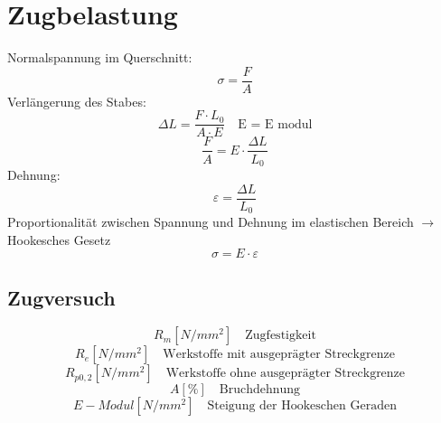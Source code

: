 



\section{Zugbelastung}
Normalspannung im Querschnitt: 
\[ \sigma = \frac{F}{A} \]
Verlängerung des Stabes: 
\[ \Delta L = \frac{F \cdot L_0}{A \cdot E} \quad \text{E = E modul} \]
\[ \frac{F}{A} = E \cdot \frac{\Delta L}{L_0} \]
Dehnung: 
\[ \varepsilon = \frac{\Delta L}{L_0} \]
Proportionalität zwischen Spannung und Dehnung im elastischen Bereich $\rightarrow$ Hookesches Gesetz
\[ \sigma = E \cdot \varepsilon \]
\subsection{Zugversuch}
\[ R_m [N/mm^2] \quad \text{Zugfestigkeit} \]
\[ R_e [N/mm^2] \quad \text{Werkstoffe mit ausgeprägter Streckgrenze} \]
\[ R_{p0,2} [N/mm^2] \quad \text{Werkstoffe ohne ausgeprägter Streckgrenze} \]
\[ A [\%] \quad \text{Bruchdehnung} \]
\[ E-Modul [N/mm^2] \quad \text{Steigung der Hookeschen Geraden} \]

